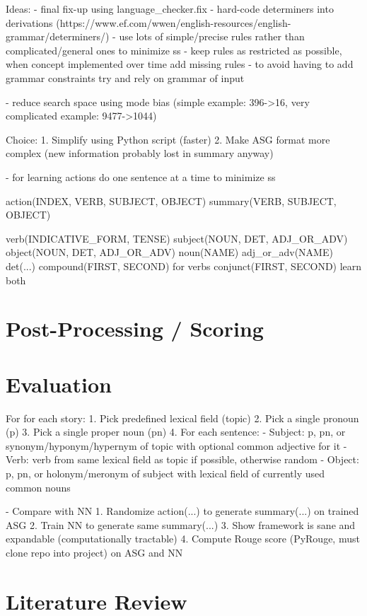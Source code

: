 \documentclass[12pt,twoside]{report}
\theoremstyle{definition}
\begin{document}
Ideas:
- final fix-up using language\_checker.fix
- hard-code determiners into derivations (https://www.ef.com/wwen/english-resources/english-grammar/determiners/)
- use lots of simple/precise rules rather than complicated/general ones to minimize ss
- keep rules as restricted as possible, when concept implemented over time add missing rules
- to avoid having to add grammar constraints try and rely on grammar of input

- reduce search space using mode bias (simple example: 396->16, very complicated example: 9477->1044)

Choice:
1. Simplify using Python script (faster)
2. Make ASG format more complex (new information probably lost in summary anyway)

- for learning actions do one sentence at a time to minimize ss

action(INDEX, VERB, SUBJECT, OBJECT)
summary(VERB, SUBJECT, OBJECT)

verb(INDICATIVE\_FORM, TENSE)
subject(NOUN, DET, ADJ\_OR\_ADV)
object(NOUN, DET, ADJ\_OR\_ADV)
noun(NAME)
adj\_or\_adv(NAME)
det(...)
compound(FIRST, SECOND)  for verbs
conjunct(FIRST, SECOND)  learn both

\chapter{Post-Processing / Scoring}


\chapter{Evaluation}


For for each story:
1. Pick predefined lexical field (topic)
2. Pick a single pronoun (p)
3. Pick a single proper noun (pn)
4. For each sentence:
    - Subject: p, pn, or synonym/hyponym/hypernym of topic with optional common adjective for it
    - Verb: verb from same lexical field as topic if possible, otherwise random
    - Object: p, pn, or holonym/meronym of subject with lexical field of currently used common nouns
    

- Compare with NN
    1. Randomize action(...) to generate summary(...) on trained ASG
    2. Train NN to generate same summary(...)
    3. Show framework is sane and expandable (computationally tractable)
    4. Compute Rouge score (PyRouge, must clone repo into project) on ASG and NN

\chapter{Literature Review}


\begin{appendices}


\end{appendices}



\pagestyle{PageNum}
\end{document}
